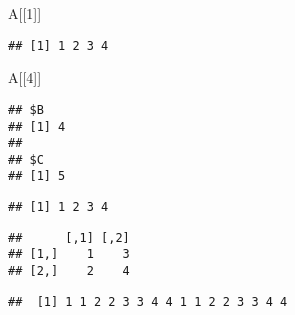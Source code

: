 \documentclass[]{article}
\newenvironment{Shaded}{\begin{snugshade}}{\end{snugshade}}
\newcommand{\DecValTok}[1]{\textcolor[rgb]{0.00,0.00,0.81}{#1}}
\newcommand{\OperatorTok}[1]{\textcolor[rgb]{0.81,0.36,0.00}{\textbf{#1}}}
\newcommand{\NormalTok}[1]{#1}
\begin{document}
\begin{Shaded}
\begin{Highlighting}[]
\NormalTok{A[[}\DecValTok{1}\NormalTok{]]}
\end{Highlighting}
\end{Shaded}

\begin{verbatim}
## [1] 1 2 3 4
\end{verbatim}

\begin{Shaded}
\begin{Highlighting}[]
\NormalTok{A[[}\DecValTok{4}\NormalTok{]]}
\end{Highlighting}
\end{Shaded}

\begin{verbatim}
## $B
## [1] 4
## 
## $C
## [1] 5
\end{verbatim}

\begin{Shaded}
\end{Shaded}

\begin{verbatim}
## [1] 1 2 3 4
\end{verbatim}

\begin{Shaded}
\end{Shaded}

\begin{verbatim}
##      [,1] [,2]
## [1,]    1    3
## [2,]    2    4
\end{verbatim}

\begin{Shaded}
\end{Shaded}

\begin{verbatim}
##  [1] 1 1 2 2 3 3 4 4 1 1 2 2 3 3 4 4
\end{verbatim}

\begin{Shaded}
\end{Shaded}
\end{document}
